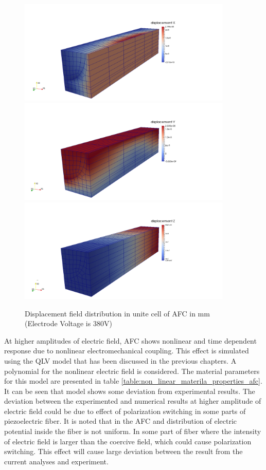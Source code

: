 \begin{figure}
\centering
{}
{\includegraphics[width=4in]{./chap_4_structural_analyses/afc_unit_cell/afc_displacement_x.png}}
{\includegraphics[width=4in]{./chap_4_structural_analyses/afc_unit_cell/afc_displacement_y.png}}
{\includegraphics[width=4in]{./chap_4_structural_analyses/afc_unit_cell/afc_displacement_z.png}}
\caption{Displacement field distribution in unite cell of AFC in mm (Electrode Voltage is 380V)}
\label{afc_displacement_all:fig}
\end{figure}

At higher amplitudes of electric field, AFC shows nonlinear and time dependent response due to nonlinear electromechanical coupling. 
This effect is simulated using the QLV model that has been discussed in the previous chapters. 
A polynomial for the nonlinear electric field is considered. 
The material parameters for this model are presented in table \ref{table:non_linear_materila_properties_afc}.
It can be seen that model shows some deviation from experimental results.
The deviation between the experimented and numerical results at higher amplitude of electric field could be due to effect of polarization switching in some parts of piezoelectric fiber.
It is noted that in the AFC and distribution of electric potential inside the fiber is not uniform.
In some part of fiber where the intensity of electric field is larger than the coercive field, which could cause polarization switching.
This effect will cause large deviation between the result from the current analyses and experiment.


